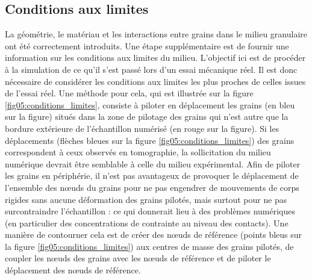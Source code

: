 	\subsection{Conditions aux limites}\label{para05:abaqus_BC}
		La géométrie, le matériau et les interactions entre grains dans le milieu granulaire ont été correctement introduits. Une étape supplémentaire est de fournir une information sur les conditions aux limites du milieu. L'objectif ici est de procéder à la simulation de ce qu'il s'est passé lors d'un essai mécanique réel. Il est donc nécessaire de considérer les conditions aux limites les plus proches de celles issues de l'essai réel. Une méthode pour cela, qui est illustrée sur la figure \ref{fig05:conditions_limites}, consiste à piloter en déplacement les grains (en bleu sur la figure) situés dans la zone de pilotage des grains qui n'est autre que la bordure extérieure de l'échantillon numérisé (en rouge sur la figure). Si les déplacements (flèches bleues sur la figure \ref{fig05:conditions_limites}) des grains correspondent à ceux observés en tomographie, la sollicitation du milieu numérique devrait être semblable à celle du milieu expérimental. Afin de piloter les grains en périphérie, il n'est pas avantageux de provoquer le déplacement de l'ensemble des n\oe{}uds du grains pour ne pas engendrer de mouvements de corps rigides sans aucune déformation des grains pilotés, mais surtout pour ne pas surcontraindre l'échantillon : ce qui donnerait lieu à des problèmes numériques (en particulier des concentrations de contrainte au niveau des contacts). Une manière de contourner cela est de créer des n\oe{}uds de référence (points bleus sur la figure \ref{fig05:conditions_limites}) aux centres de masse des grains pilotés, de coupler les n\oe{}uds des grains avec les n\oe{}uds de référence et de piloter le déplacement des n\oe{}uds de référence.
